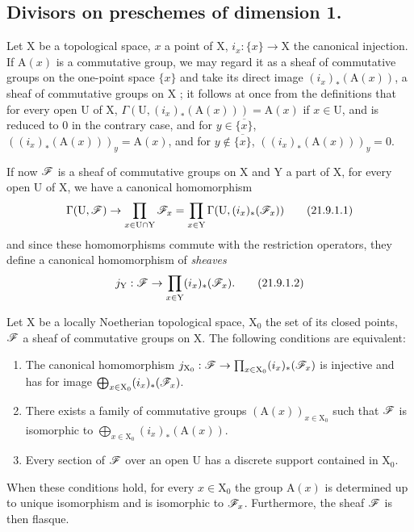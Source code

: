 \subsection{Divisors on preschemes of dimension 1.}
\label{subsection:IV.21.9}
\label{IV.21.9}

\begin{env}[21.9.1]
\label{IV.21.9.1}
Let $\mathrm{X}$ be a topological space, $x$ a point of $\mathrm{X}$, $i_x:\{x\}\to\mathrm{X}$ the canonical injection.
If $\mathrm{A}(x)$ is a commutative group, we may regard it as a sheaf of commutative groups on the one-point space $\{x\}$ and take its direct image $(i_x)_*(\mathrm{A}(x))$, a sheaf of commutative groups on $\mathrm{X}$ ;
it follows at once from the definitions that for every open $\mathrm{U}$ of $\mathrm{X}$, $\Gamma(\mathrm{U},(i_x)_*(\mathrm{A}(x)))=\mathrm{A}(x)$ if $x\in\mathrm{U}$, and is reduced to $0$ in the contrary case, and for $y\in\overline{\{x\}}$, $((i_x)_*(\mathrm{A}(x)))_y=\mathrm{A}(x)$, and for $y\notin\overline{\{x\}}$, $((i_x)_*(\mathrm{A}(x)))_y=0$.

If now $\mathscr{F}$ is a sheaf of commutative groups on $\mathrm{X}$ and $\mathrm{Y}$ a part of $\mathrm{X}$, for every open $\mathrm{U}$ of $\mathrm{X}$, we have a canonical homomorphism
\[
\label{IV.21.9.1.1}
  \Gamma(\mathrm{U},\mathscr{F})\to\prod_{x\in\mathrm{U}\cap\mathrm{Y}}\mathscr{F}_x=\prod_{x\in\mathrm{Y}}\Gamma(\mathrm{U},(i_x)_*(\mathscr{F}_x))
  \tag{21.9.1.1}
\]
and since these homomorphisms commute with the restriction operators, they define a canonical homomorphism of \emph{sheaves}
\[
\label{IV.21.9.1.2}
  j_\mathrm{Y}:\mathscr{F}\to\prod_{x\in\mathrm{Y}}(i_x)_*(\mathscr{F}_x).
  \tag{21.9.1.2}
\]
\end{env}

\begin{lemma}[21.9.2]
\label{IV.21.9.2}
Let $\mathrm{X}$ be a locally Noetherian topological space, $\mathrm{X}_0$ the set of its closed points, $\mathscr{F}$ a sheaf of commutative groups on $\mathrm{X}$.
The following conditions are equivalent:
\begin{enumerate}[label=\emph{\alph*)}]
  \item The canonical homomorphism $j_{\mathrm{X}_0}:\mathscr{F}\to\prod_{x\in\mathrm{X}_0}(i_x)_*(\mathscr{F}_x)$ is injective and has for image $\bigoplus_{x\in\mathrm{X}_0}(i_x)_*(\mathscr{F}_x)$.
  \item[\rm a$'$)] There exists a family of commutative groups $(\mathrm{A}(x))_{x\in\mathrm{X}_0}$ such that $\mathscr{F}$ is isomorphic to $\bigoplus_{x\in\mathrm{X}_0}(i_x)_*(\mathrm{A}(x))$.
  \item Every section of $\mathscr{F}$ over an open $\mathrm{U}$ has a discrete support contained in $\mathrm{X}_0$.
\end{enumerate}
When these conditions hold, for every $x\in\mathrm{X}_0$ the group $\mathrm{A}(x)$ is determined up to unique isomorphism and is isomorphic to $\mathscr{F}_x$.
Furthermore, the sheaf $\mathscr{F}$ is then flasque.
\end{lemma}


